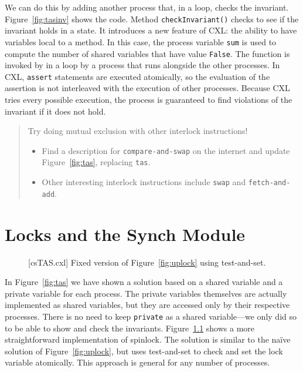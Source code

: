 \documentclass{report}
\newenvironment{code}{
\tcolorbox
}{
\endtcolorbox
}
\begin{document}
We can do this by adding another process that, in a loop,
checks the invariant.  Figure~\ref{fig:tasinv} shows the code.
Method \texttt{checkInvariant()} checks to see if the invariant holds
in a state.  It introduces a new feature of CXL: the ability to have
variables local to a method.  In this case, the process variable \texttt{sum}
is used to compute the number of shared variables that have value
\texttt{False}.
The function is invoked by in a loop by a process that runs alongside
the other processes.
In CXL, \texttt{assert} statements are executed atomically, so the
evaluation of the assertion is not interleaved with the execution
of other processes.
Because CXL tries every possible execution, the process is guaranteed
to find violations of the invariant if it does not hold.

\begin{quote}
Try doing mutual exclusion with other interlock instructions!
\begin{itemize}
\item Find a description for \texttt{compare-and-swap} on the internet and
update Figure~\ref{fig:tas}, replacing \texttt{tas}.
\item Other interesting interlock instructions include \texttt{swap} and
\texttt{fetch-and-add}.
\end{itemize}
\end{quote}

\chapter{Locks and the Synch Module}

\begin{figure}
\begin{code}
\end{code}
\caption{[csTAS.cxl] Fixed version of Figure~\ref{fig:uplock} using test-and-set.}
\label{fig:tas2}
\end{figure}

In Figure~\ref{fig:tas} we have shown a solution based on a shared
variable and a private variable for each process.   The private
variables themselves are actually implemented as shared variables,
but they are accessed only by their respective processes.
There is no need to keep \texttt{private} as a shared
variable---we only did so to be able to show and check the invariants.
Figure~\ref{fig:tas2} shows a more straightforward implementation of spinlock.
The solution is similar to the na\"{i}ve solution of Figure~\ref{fig:uplock},
but uses test-and-set to check and set the lock variable atomically.
This approach is general for any number of processes.
\end{document}
